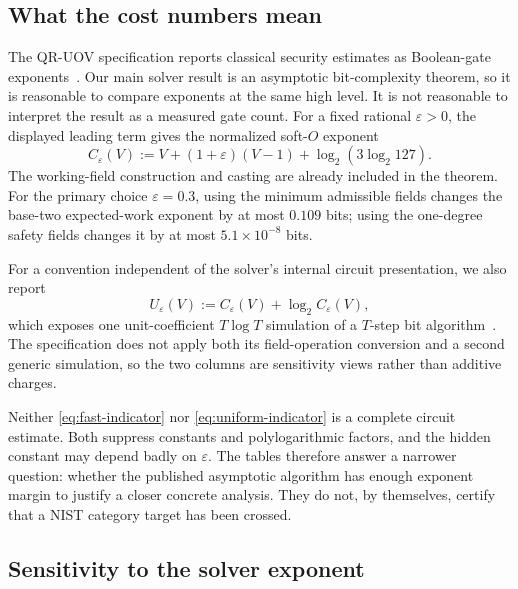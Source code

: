 \documentclass[11pt,a4paper]{article}
\theoremstyle{definition}
\theoremstyle{remark}
\begin{document}
\subsection{What the cost numbers mean}

The QR-UOV specification reports classical security estimates as Boolean-gate exponents~\cite[Section~6.3 and Table~14]{QRUOVSpec}.  Our main solver result is an asymptotic bit-complexity theorem, so it is reasonable to compare exponents at the same high level.  It is not reasonable to interpret the result as a measured gate count.  For a fixed rational $\varepsilon>0$, the displayed leading term gives the normalized soft-$O$ exponent
\begin{equation}\label{eq:fast-indicator}
 C_\varepsilon(V)
 :=V+(1+\varepsilon)(V-1)+\log_2(3\log_2 127).
\end{equation}
The working-field construction and casting are already included in the theorem.  For the primary choice $\varepsilon=0.3$, using the minimum admissible fields changes the base-two expected-work exponent by at most $0.109$ bits; using the one-degree safety fields changes it by at most $5.1\times10^{-8}$ bits.

For a convention independent of the solver's internal circuit presentation, we also report
\begin{equation}\label{eq:uniform-indicator}
 U_\varepsilon(V):=C_\varepsilon(V)+\log_2 C_\varepsilon(V),
\end{equation}
which exposes one unit-coefficient $T\log T$ simulation of a $T$-step bit algorithm~\cite{PippengerFischer}.  The specification does not apply both its field-operation conversion and a second generic simulation, so the two columns are sensitivity views rather than additive charges.

Neither \eqref{eq:fast-indicator} nor \eqref{eq:uniform-indicator} is a complete circuit estimate.  Both suppress constants and polylogarithmic factors, and the hidden constant may depend badly on $\varepsilon$.  The tables therefore answer a narrower question: whether the published asymptotic algorithm has enough exponent margin to justify a closer concrete analysis.  They do not, by themselves, certify that a NIST category target has been crossed.

\subsection{Sensitivity to the solver exponent}
\end{document}
